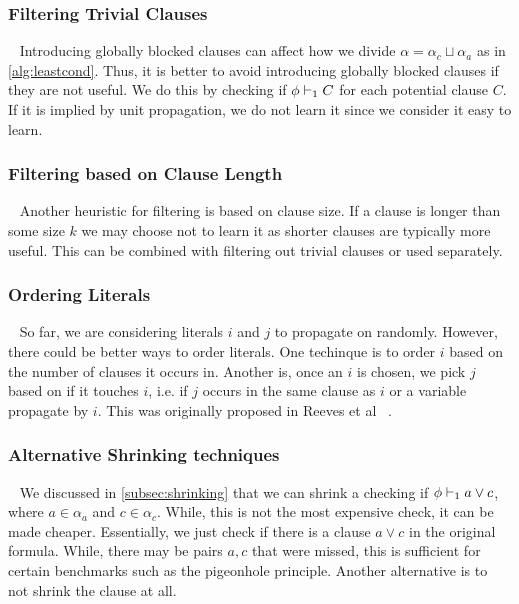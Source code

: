 
\subsubsection{Filtering Trivial Clauses}~\label{subsubsec:filteringtriv}
Introducing globally blocked clauses can affect how we divide $\alpha = \alpha_c
\sqcup \alpha_a$ as in \autoref{alg:leastcond}. Thus, it is better to avoid
introducing globally blocked clauses if they are not useful. We do this by
checking if $\phi \vdash_1 C$ for each potential clause $C$. If it is implied by
unit propagation, we do not learn it since we consider it easy to learn.

\subsubsection{Filtering based on Clause Length}~\label{subsubsec:filtering-length}
Another heuristic for filtering is based on clause size. If a clause is longer
than some size $k$ we may choose not to learn it as shorter clauses are
typically more useful. This can be combined with filtering out trivial clauses
or used separately.

\subsubsection{Ordering Literals}~\label{subsubsec:ordering-literals}
So far, we are considering literals $i$ and $j$ to propagate on randomly.
However, there could be better ways to order literals. One techinque is to order
$i$ based on the number of clauses it occurs in. Another is, once an $i$ is
chosen, we pick $j$ based on if it touches $i$, i.e. if $j$ occurs in the same
clause as $i$ or a variable propagate by $i$. This was originally proposed in
Reeves et al ~\cite{prelearn}.

\subsubsection{Alternative Shrinking techniques}~\label{subsubsec:shrink-techniques}
We discussed in \autoref{subsec:shrinking} that we can shrink a checking if $\phi
\vdash_1 a \lor c$, where $a \in \alpha_a$ and $c \in \alpha_c$. While, this is
not the most expensive check, it can be made cheaper. Essentially, we just check
if there is a clause $a \lor c$ in the original formula. While, there may be
pairs $a, c$ that were missed, this is sufficient for certain
benchmarks such as the pigeonhole principle. Another alternative is to not
shrink the clause at all.

